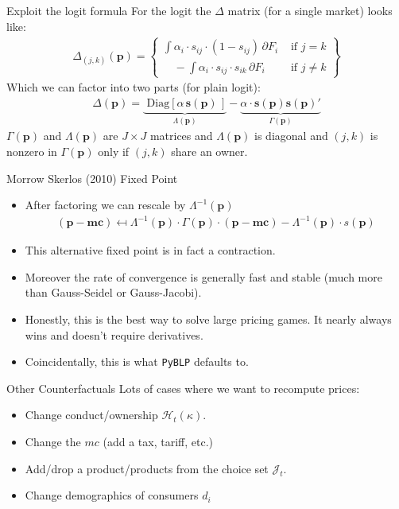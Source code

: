 \documentclass[xcolor=pdftex,dvipsnames,table,mathserif,aspectratio=169]{beamer}
\begin{document}
\begin{frame}{Exploit the logit formula}
For the logit the $\Delta$ matrix (for a single market) looks like:
\begin{align*}
\Delta_{(j,k)}(\mathbf{p}) = \left\{\begin{array}{lr}
       \int \alpha_i \cdot s_{ij}\cdot (1-s_{ij}) \, \partial F_i& \text{ if } j=k \\
       	  \quad -\int \alpha_i \cdot s_{ij} \cdot s_{ik} \, \partial F_i &  \text{ if }  j\neq k 
        \end{array} \right\}
\end{align*}
Which we can factor into two parts (for plain logit):
\begin{align*}
\Delta(\mathbf{p}) =  \underbrace{\text{ Diag}\left[ \alpha \, \mathbf{s}(\mathbf{p}) \, \right]}_{\Lambda(\mathbf{p})} -  \underbrace{\alpha \cdot \mathbf{s}(\mathbf{p}) \mathbf{s}(\mathbf{p})'}_{\Gamma(\mathbf{p})}
\end{align*}
$\Gamma(\mathbf{p})$ and $\Lambda(\mathbf{p})$ are $J \times J$ matrices and $\Lambda(\mathbf{p})$ is diagonal and $(j,k)$ is nonzero in $\Gamma(\mathbf{p})$ only if $(j,k)$ share an owner.
\end{frame}


\begin{frame}{Morrow Skerlos (2010) Fixed Point}
\begin{itemize}
\item After factoring we can rescale by $\Lambda^{-1} (\mathbf{p})$
\begin{align*}
(\mathbf{p}-\mathbf{mc} ) \mapsfrom \Lambda^{-1}(\mathbf{p}) \cdot \Gamma(\mathbf{p})\cdot(\mathbf{p}- \mathbf{mc}) - \Lambda^{-1}(\mathbf{p})\cdot s(\mathbf{p})
\end{align*}
\item This alternative fixed point is in fact a contraction.
\item Moreover the rate of convergence is generally fast and stable (much more than Gauss-Seidel or Gauss-Jacobi).
\item Honestly, this is the best way to solve large pricing games. It nearly always wins and doesn't require derivatives.
\item Coincidentally, this is what \texttt{PyBLP} defaults to.
\end{itemize}
\end{frame}



\begin{frame}{Other Counterfactuals}
Lots of cases where we want to recompute prices:
\begin{itemize}
\item Change conduct/ownership $\mathcal{H}_t(\kappa)$.
\item Change the $mc$ (add a tax, tariff, etc.)
\item Add/drop a product/products from the choice set $\mathcal{J}_t$.
\item Change demographics of consumers $d_i$
\end{itemize}
\end{frame}
\end{document}

